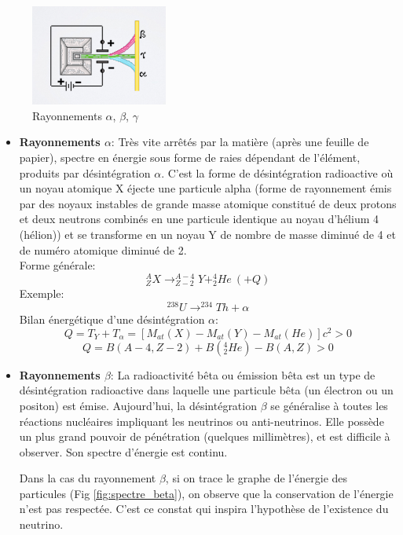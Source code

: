 \begin{figure}[ht]
    \centering
    \includegraphics[width=0.4\textwidth]{Images1/rayonnements.PNG}
    \caption{Rayonnements $\alpha$, $\beta$, $\gamma$}
    \label{fig:alpha_beta_gamma}
\end{figure}

\begin{itemize}
    \item \textbf{Rayonnements $\alpha$}: Très vite arrêtés par la matière (après une feuille de papier), spectre en énergie sous forme de raies dépendant de l'élément, produits par désintégration $\alpha$. C'est la forme de désintégration radioactive où un noyau atomique X éjecte une particule alpha (forme de rayonnement émis par des noyaux instables de grande masse atomique constitué de deux protons et deux neutrons combinés en une particule identique au noyau d'hélium 4 (hélion)) et se transforme en un noyau Y  de nombre de masse diminué de 4 et de numéro atomique diminué de 2. \\
    Forme générale:
    \[
        ^{A}_{Z}X \longrightarrow ^{A-4}_{Z-2}Y + ^{4}_{2} He ~ (+Q)
    \]
    Exemple:
    \[
        ^{238}U \longrightarrow ^{234}Th + \alpha
    \]
    Bilan énergétique d'une désintégration $\alpha$:
    \[
        Q = T_Y + T_\alpha = [M_{at}(X)-M_{at}(Y)-M_{at}(He)]c^2>0
    \]
    \[
        Q=B(A-4,Z-2)+B(^{4}_{2}He)-B(A,Z)>0
    \]

    \item \textbf{Rayonnements $\beta$}: La radioactivité bêta ou émission bêta est un type de désintégration radioactive dans laquelle une particule bêta (un électron ou un positon) est émise. Aujourd'hui, la désintégration $\beta$ se généralise à toutes les réactions nucléaires impliquant les neutrinos ou anti-neutrinos. Elle possède un plus grand pouvoir de pénétration (quelques millimètres), et est difficile à observer. Son spectre d'énergie est continu.

    Dans la cas du rayonnement $\beta$, si on trace le graphe de l'énergie des particules (Fig \ref{fig:spectre_beta}), on observe que la conservation de l'énergie n'est pas respectée. C'est ce constat qui inspira l'hypothèse de l'existence du neutrino.


\end{itemize}
